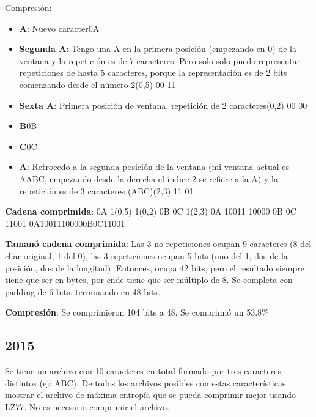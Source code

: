 \documentclass[a4paper]{article}
\newenvironment{enunciado}[3]{%
    \vspace{\baselineskip}
    \tcolorbox[beamer,%
    noparskip,breakable,
    colback=LightGreen,colframe=DarkGreen,%
    colbacklower=LimeGreen!75!LightGreen,%
    title=\small Enunciado: Año #1\, Cuatrimestre #2\, Oportunidad #3]}%
    {\endtcolorbox}
\begin{document}
	Compresión:
    \begin{itemize}
        \item \textbf{A}: Nuevo caracter\textrightarrow 0A
        \item \textbf{Segunda A}: Tengo una A en la primera posición (empezando en 0) de la ventana y la repetición es de 7 caracteres. Pero solo solo puedo representar repeticiones de hasta 5 caracteres, porque la representación es de 2 bits comenzando desde el número 2(0,5) 00 11
        \item \textbf{Sexta A}: Primera posición de ventana, repetición de 2 caracteres(0,2) 00 00 
        \item \textbf{B}\textrightarrow 0B
        \item \textbf{C}\textrightarrow 0C
        \item \textbf{A}: Retrocedo a la segunda posición de la ventana (mi ventana actual es AABC, empezando desde la derecha el índice 2 se refiere a la A) y la repetición es de 3 caracteres (ABC)(2,3) 11 01
    \end{itemize}

	\textbf{Cadena comprimida}: 0A 1(0,5) 1(0,2) 0B 0C 1(2,3) \textrightarrow 0A 10011 10000 0B 0C 11001 \textrightarrow 0A10011100000B0C11001
	
    \textbf{Tamanó cadena comprimida}: Las 3 no repeticiones ocupan 9 caracteres (8 del char original, 1 del 0), las 3 repeticiones ocupan 5 bits (uno del 1, dos de la posición, dos de la longitud). Entonces, ocupa 42 bits, pero el resultado siempre tiene que ser en bytes, por ende tiene que ser múltiplo de 8. Se completa con padding de 6 bits, terminando en 48 bits.

    \textbf{Compresión}: Se comprimieron 104 bits a 48. Se comprimió un 53.8\%

    
    \subsection{2015}

    \begin{enunciado}{2015}{2}{1}
        Se tiene un archivo con 10 caracteres en total formado por tres caracteres distintos (ej: ABC). De todos los archivos posibles con estas características mostrar el archivo de máxima entropía que se pueda comprimir mejor usando LZ77. No es necesario comprimir el archivo.
    \end{enunciado}
\end{document}
